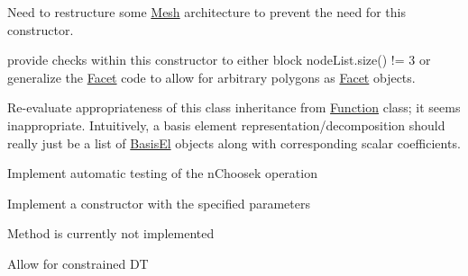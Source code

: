 
\begin{DoxyRefList}
\item[\label{todo__todo000006}%
\Hypertarget{todo__todo000006}%
Member \mbox{\hyperlink{class_facet_acfcdcc63ac32fc2a1d0378a899441bbc}{Facet\+:\+:Facet}} (double a)]Need to restructure some \mbox{\hyperlink{class_mesh}{Mesh}} architecture to prevent the need for this constructor.  
\item[\label{todo__todo000007}%
\Hypertarget{todo__todo000007}%
Member \mbox{\hyperlink{class_facet_aaecf4566bbdbfb3904d9c3ce6f7c41cf}{Facet\+:\+:Facet}} (std\+::vector$<$ Node $\ast$$>$ node\+List)]provide checks within this constructor to either block node\+List.\+size() != 3 or generalize the \mbox{\hyperlink{class_facet}{Facet}} code to allow for arbitrary polygons as \mbox{\hyperlink{class_facet}{Facet}} objects.  
\item[\label{todo__todo000001}%
\Hypertarget{todo__todo000001}%
Class \mbox{\hyperlink{class_math_1_1_basis_rep}{Math\+:\+:Basis\+Rep}} ]Re-\/evaluate appropriateness of this class\textquotesingle{} inheritance from \mbox{\hyperlink{class_math_1_1_function}{Function}} class; it seems inappropriate. Intuitively, a basis element representation/decomposition should really just be a list of \mbox{\hyperlink{class_math_1_1_basis_el}{Basis\+El}} objects along with corresponding scalar coefficients.  
\item[\label{todo__todo000002}%
\Hypertarget{todo__todo000002}%
Member \mbox{\hyperlink{class_math_1_1_combinatorics_a174253b11651917aab46bc879449e59b}{Math\+:\+:Combinatorics\+:\+:testn\+Choosek}} (void)]Implement automatic testing of the n\+Choosek operation  
\item[\label{todo__todo000003}%
\Hypertarget{todo__todo000003}%
Member \mbox{\hyperlink{class_math_1_1_function_a97e51108b0374f8adc7982f92af4d0de}{Math\+:\+:Function\+:\+:Function}} ()]Implement a constructor with the specified parameters  
\item[\label{todo__todo000004}%
\Hypertarget{todo__todo000004}%
Member \mbox{\hyperlink{class_math_1_1_function_ad85e716accc64c1ea4962c828c4e216c}{Math\+:\+:Function\+:\+:integrate\+On\+Domain}} (void)]Method is currently not implemented  
\item[\label{todo__todo000005}%
\Hypertarget{todo__todo000005}%
Class \mbox{\hyperlink{class_mesh}{Mesh}} ]Allow for constrained DT 
\end{DoxyRefList}